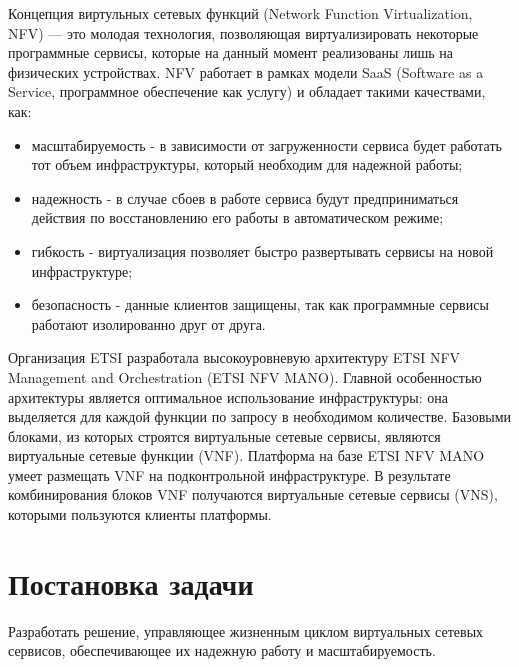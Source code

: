 \documentclass[oneside,final,14pt,a4paper]{extreport}
\begin{document}
Концепция виртульных сетевых функций (Network Function Virtualization, NFV) --- это молодая технология, позволяющая виртуализировать некоторые программные сервисы, которые на данный момент реализованы лишь на физических устройствах. NFV работает в рамках модели SaaS (Software as a Service, программное обеспечение как услугу) и обладает такими качествами, как:
\begin{itemize}
	\item масштабируемость - в зависимости от загруженности сервиса будет работать тот объем инфраструктуры, который необходим для надежной работы;
	\item надежность - в случае сбоев в работе сервиса будут предприниматься действия по восстановлению его работы в автоматическом режиме;
	\item гибкость - виртуализация позволяет быстро развертывать сервисы на новой инфраструктуре;
	\item безопасность - данные клиентов защищены, так как программные сервисы работают изолированно друг от друга.
\end{itemize}

Организация ETSI разработала высокоуровневую архитектуру ETSI NFV Management and Orchestration (ETSI NFV MANO). Главной особенностью архитектуры является оптимальное использование инфраструктуры: она выделяется для каждой функции по запросу в необходимом количестве. Базовыми блоками, из которых строятся виртуальные сетевые сервисы, являются виртуальные сетевые функции (VNF). Платформа на базе ETSI NFV MANO умеет размещать VNF на подконтрольной инфраструктуре. В результате комбинирования блоков VNF получаются виртуальные сетевые сервисы (VNS), которыми пользуются клиенты платформы.





\chapter{Постановка задачи}
\label{chap:problem_statement}
Разработать решение, управляющее жизненным циклом виртуальных сетевых сервисов, обеспечивающее их надежную работу и масштабируемость.
\end{document}
